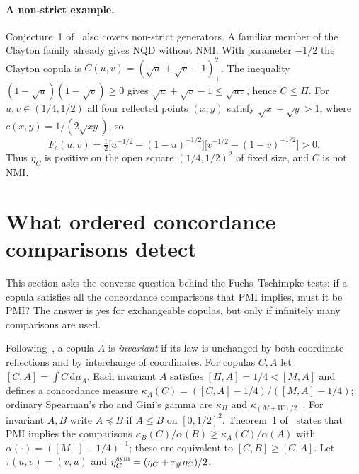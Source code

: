 \documentclass[11pt,a4paper]{article}
\theoremstyle{remark}
\newcommand{\dd}{\,\mathrm d}
\begin{document}
\paragraph{A non-strict example.} Conjecture~1 of~\cite{FT} also covers non-strict generators. A familiar member of the Clayton family already gives NQD without NMI. With parameter $-1/2$ the Clayton copula is $C(u,v)=(\sqrt u+\sqrt v-1)_+^2$. The inequality $(1-\sqrt u)(1-\sqrt v)\geq0$ gives $\sqrt u+\sqrt v-1\leq\sqrt{uv}$, hence $C\leq\Pi$. For $u,v\in(1/4,1/2)$ all four reflected points $(x,y)$ satisfy $\sqrt x+\sqrt y>1$, where $c(x,y)=1/(2\sqrt{xy})$, so
\[
 F_c(u,v)=\tfrac12\big[u^{-1/2}-(1-u)^{-1/2}\big]\big[v^{-1/2}-(1-v)^{-1/2}\big]>0 .
\]
Thus $\eta_C$ is positive on the open square $(1/4,1/2)^2$ of fixed size, and $C$ is not NMI.

\section{What ordered concordance comparisons detect}\label{sec:dual}
This section asks the converse question behind the Fuchs--Tschimpke tests: if a copula satisfies all the concordance comparisons that PMI implies, must it be PMI? The answer is yes for exchangeable copulas, but only if infinitely many comparisons are used.

Following~\cite{FT}, a copula $A$ is \emph{invariant} if its law is unchanged by both coordinate reflections and by interchange of coordinates. For copulas $C,A$ let $[C,A]=\int C\dd\mu_A$. Each invariant $A$ satisfies $[\Pi,A]=1/4<[M,A]$ and defines a concordance measure $\kappa_A(C)=([C,A]-1/4)/([M,A]-1/4)$; ordinary Spearman's rho and Gini's gamma are $\kappa_\Pi$ and $\kappa_{(M+W)/2}$~\cite[Example~8]{FT}. For invariant $A,B$ write $A\preceq B$ if $A\leq B$ on $[0,1/2]^2$. Theorem~1 of~\cite{FT} states that PMI implies the comparisons $\kappa_B(C)/\alpha(B)\geq\kappa_A(C)/\alpha(A)$ with $\alpha(\cdot)=([M,\cdot]-1/4)^{-1}$; these are equivalent to $[C,B]\geq[C,A]$. Let $\tau(u,v)=(v,u)$ and $\eta_C^{\rm sym}=(\eta_C+\tau_\#\eta_C)/2$.
\end{document}
